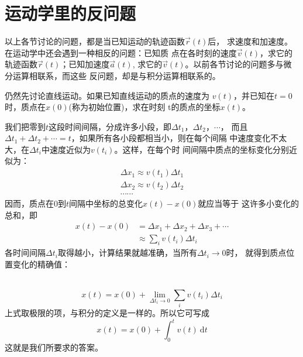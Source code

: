 \section{运动学里的反问题}\label{sec:01.11}

    以上各节讨论的问题，都是当已知运动的轨迹函数$\vec{r}\left(t\right)$后，
求速度和加速度。在运动学中还会遇到一种相反的问题：已知质
点在各时刻的速度$\vec{v}\left(t\right)$，求它的轨迹函数$\vec{r}\left(t\right)$；已知加速度$\vec{a}\left(t\right)$,
求它的$\vec{v}\left(t\right)$。以前各节讨论的问题多与微分运算相联系，而这些
反问题，却是与积分运算相联系的。

    仍然先讨论直线运动。如果已知直线运动的质点的速度为
$v\left(t\right)$，并已知在$t=0$时，质点在$x\left(0\right)$(称为初始位置)，求在时刻
t的质点的坐标$x\left(t\right)$。

    我们把零到$t$这段时间间隔，分成许多小段，即$\Delta t_1$，$\Delta t_2$，$\cdots$，
而且$\Delta t_1+\Delta t_2+\cdots=t$，如果所有各小段都相当小，则在每个间隔
中速度变化不太大，在$\Delta t_i$中速度近似为$v\left(t_i\right)$。这样，在每个时
间间隔中质点的坐标变化分别近似为：
\begin{equation*}
    \begin{array}{l}
        \Delta x_{1} \approx v\left(t_{1}\right) \Delta t_{1} \\[-1pt]
        \Delta x_{2} \approx v\left(t_{2}\right) \Delta t_{2} \\[-1pt]
        \cdots \cdots
    \end{array}
\end{equation*}
因而，质点在0到$t$间隔中坐标的总变化$x\left(t\right)-x\left(0\right)$就应当等于
这许多小变化的总和，即\vspace{-0.5em}
\begin{equation}\label{eqn:01.11.01}
    \begin{aligned}
        x\left(t\right)-x\left(0\right) &=\Delta x_{1}+\Delta x_{2}+\Delta x_{3}+\cdots \\[-1pt]
        & \approx \sum_{i} v\left(t_{i}\right) \Delta t_{i}
    \end{aligned}
\end{equation}
各时间间隔$\Delta t_i$取得越小，计算结果就越准确，当所有$\Delta t_i\rightarrow 0$时，
就得到质点位置变化的精确值：

~\vspace{-1.56em}
\begin{equation}\label{eqn:01.11.02}
    x\left(t\right)=x\left(0\right)+\lim _{\Delta t_{i} \rightarrow 0} \sum_{i} v\left(t_{i}\right) \Delta t_{i}
\end{equation}
上式取极限的项，与积分的定义是一样的。所以它可写成
\begin{equation}\label{eqn:01.11.03}
    x\left(t\right)=x\left(0\right)+\int_{0}^{t} v\left(t\right) {~\mathrm d}  t
\end{equation}
这就是我们所要求的答案。


